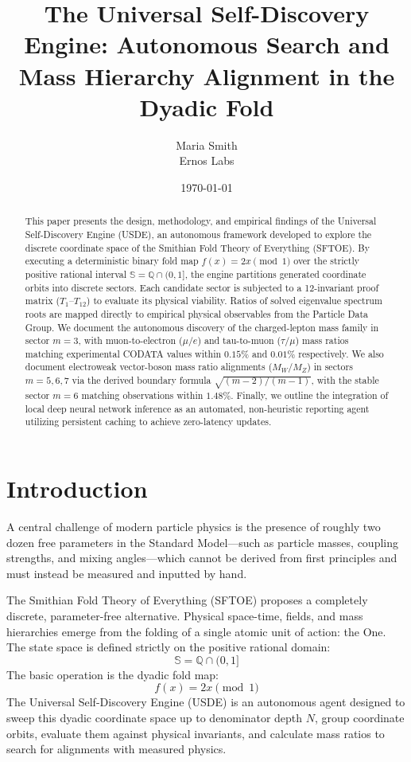 \documentclass[11pt,a4paper]{article}
\title{\textbf{The Universal Self-Discovery Engine: Autonomous Search and Mass Hierarchy Alignment in the Dyadic Fold}}
\author{Maria Smith \\ Ernos Labs}
\date{\today}
\begin{document}
\maketitle

\begin{abstract}
This paper presents the design, methodology, and empirical findings of the Universal Self-Discovery Engine (USDE), an autonomous framework developed to explore the discrete coordinate space of the Smithian Fold Theory of Everything (SFTOE). By executing a deterministic binary fold map $f(x) = 2x \pmod 1$ over the strictly positive rational interval $\mathbb{S} = \mathbb{Q} \cap (0, 1]$, the engine partitions generated coordinate orbits into discrete sectors. Each candidate sector is subjected to a 12-invariant proof matrix ($T_1$--$T_{12}$) to evaluate its physical viability. Ratios of solved eigenvalue spectrum roots are mapped directly to empirical physical observables from the Particle Data Group. We document the autonomous discovery of the charged-lepton mass family in sector $m=3$, with muon-to-electron ($\mu/e$) and tau-to-muon ($\tau/\mu$) mass ratios matching experimental CODATA values within $0.15\%$ and $0.01\%$ respectively. We also document electroweak vector-boson mass ratio alignments ($M_W/M_Z$) in sectors $m=5, 6, 7$ via the derived boundary formula $\sqrt{(m-2)/(m-1)}$, with the stable sector $m=6$ matching observations within $1.48\%$. Finally, we outline the integration of local deep neural network inference as an automated, non-heuristic reporting agent utilizing persistent caching to achieve zero-latency updates.
\end{abstract}

\section{Introduction}
A central challenge of modern particle physics is the presence of roughly two dozen free parameters in the Standard Model---such as particle masses, coupling strengths, and mixing angles---which cannot be derived from first principles and must instead be measured and inputted by hand. 

The Smithian Fold Theory of Everything (SFTOE) proposes a completely discrete, parameter-free alternative. Physical space-time, fields, and mass hierarchies emerge from the folding of a single atomic unit of action: the One. The state space is defined strictly on the positive rational domain:
\begin{equation}
\mathbb{S} = \mathbb{Q} \cap (0, 1]
\end{equation}
The basic operation is the dyadic fold map:
\begin{equation}
f(x) = 2x \pmod 1
\end{equation}
The Universal Self-Discovery Engine (USDE) is an autonomous agent designed to sweep this dyadic coordinate space up to denominator depth $N$, group coordinate orbits, evaluate them against physical invariants, and calculate mass ratios to search for alignments with measured physics.
\end{document}
